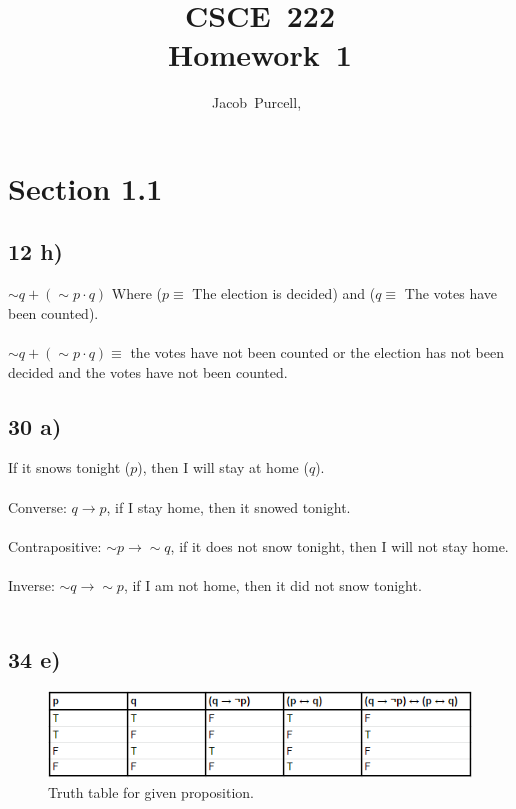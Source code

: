 \documentclass[journal]{IEEEtran}
\begin{document}
\title{CSCE~222 \\ Homework~1}

\author{Jacob~Purcell,~}

\maketitle
\section*{Section 1.1}
\subsection*{12 h)}

	$\sim q+(\sim p \cdot q)$ Where ($p \equiv$ The election is decided) and 
	($q \equiv$ The votes have been counted). \\\\

	$\sim q+(\sim p \cdot q) \equiv$ the votes have not been counted or the 
	election has not been decided and the votes have not been counted.

	\subsection*{30 a) }

	If it snows tonight ($p$), then I will stay at home ($q$). \\\\
	Converse: $q \rightarrow p$, if I stay home, then it snowed tonight.\\\\
	Contrapositive: $\sim p \rightarrow \sim q$, if it does not snow tonight, then I will not stay home.\\\\
	Inverse: $\sim q \rightarrow \sim p$, if I am not home, then it did not snow tonight.\\\\

	\subsection*{34 e)  }

		\begin{figure}[H]
			\includegraphics[scale = 0.55]{34E.PNG}
			\caption{Truth table for given proposition.}
		\end{figure}
\end{document}
